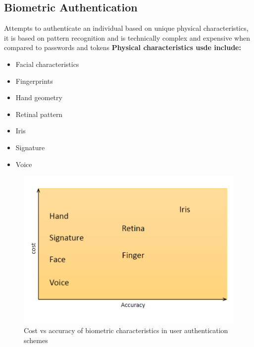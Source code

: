 \documentclass{article}
\begin{document}
                \subsection{Biometric Authentication}
                Attempts to authenticate an individual based
                on unique physical characteristics, it is based on pattern recognition and is technically complex and expensive when
                compared to passwords and tokens
                \textbf{Physical characteristics usde include:}
                \begin{itemize}
                    \item Facial characteristics
                    \item Fingerprints
                    \item Hand geometry
                    \item Retinal pattern
                    \item Iris
                    \item Signature
                    \item Voice
                \end{itemize}

                \begin{figure}[h]
                    \begin{center}
                        \includegraphics[scale=0.5]{../immagini/cost_accuracy.png}
                    \end{center}
                    \caption{Cost vs
                    accuracy of
                    biometric
                    characteristics
                    in user
                    authentication
                    schemes}
                \end{figure}
\end{document}
